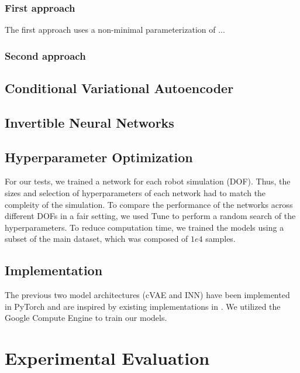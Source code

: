 \documentclass[conference]{IEEEtran}
\begin{document}
\subsubsection*{First approach}
The first approach uses a  non-minimal parameterization of ...

\subsubsection*{Second approach}




\subsection*{Conditional Variational Autoencoder}

\subsection*{Invertible Neural Networks}

\subsection*{Hyperparameter Optimization}

For our tests, we trained a network for each robot simulation (DOF). Thus, the sizes and selection of hyperparameters of each network had to match the compleity of the simulation. To compare the performance of the networks across different DOFs in a fair setting, we used Tune \cite{liaw2018tune} to perform a random search of the hyperparameters. To reduce computation time, we trained the models using a subset of the main dataset, which was composed of \( 1e4 \) samples.


\subsection*{Implementation}

The previous two model architectures (cVAE and INN) have been implemented in PyTorch and are inspired by existing implementations in  \cite{graviraja2019, freia2020}. We utilized the Google Compute Engine to train our models.

\section*{Experimental Evaluation}
\end{document}
